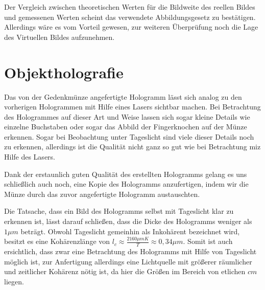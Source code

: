 \documentclass[bigchapter,colorback,accentcolor=tud4b,linedtoc,11pt]{tudreport}
\begin{document}
Der Vergleich zwischen theoretischen Werten für die Bildweite des reellen Bildes
und gemessenen Werten scheint das verwendete Abbildungsgesetz zu
bestätigen. Allerdings wäre es vom Vorteil gewesen, zur weiteren Überprüfung
noch die Lage des Virtuellen Bildes aufzunehmen.

\section{Objektholografie}
Das von der Gedenkmünze angefertigte Hologramm lässt sich analog zu den
vorherigen Hologrammen mit Hilfe eines Lasers sichtbar machen. Bei Betrachtung
des Hologrammes auf dieser Art und Weise lassen sich sogar kleine Details wie
einzelne Buchstaben oder sogar das Abbild der Fingerknochen auf der Münze
erkennen. Sogar bei Beobachtung unter Tageslicht sind viele dieser Details noch
zu erkennen, allerdings ist die Qualität nicht ganz so gut wie bei Betrachtung
miz Hilfe des Lasers.

Dank der erstaunlich guten Qualität des erstellten Hologramms gelang es uns
schließlich auch noch, eine Kopie des Hologramms anzufertigen, indem wir die
Münze durch das zuvor angefertigte Hologramm austauschten.

Die Tatsache, dass ein Bild des Hologramms selbst mit Tageslicht klar zu
erkennen ist, lässt darauf schließen, dass die Dicke des Hologramms weniger als
$1\mu m$ beträgt. Obwohl Tageslicht gemeinhin als Inkohärent bezeichnet wird,
besitzt es eine Kohärenzlänge von
$l_c \approx \frac{2160\mu m K}{T} \approx 0,34\mu m$. Somit ist auch
ersichtlich, dass zwar eine Betrachtung des Hologramms mit Hilfe von Tageslicht
möglich ist, zur Anfertigung allerdings eine Lichtquelle mit größerer räumlicher
und zeitlicher Kohärenz nötig ist, da hier die Größen im Bereich von etlichen
$cm$ liegen.
\end{document}
